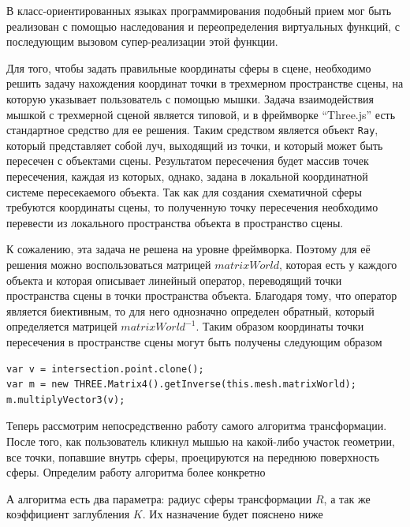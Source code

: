 \documentclass[12pt, a4paper]{article}
\begin{document}
В класс-ориентированных языках программирования подобный прием мог быть
реализован с помощью наследования и переопределения
виртуальных функций, с последующим вызовом супер-реализации этой функции.

Для того, чтобы задать правильные координаты сферы в сцене, необходимо решить
задачу нахождения координат точки в трехмерном пространстве сцены, на которую
указывает пользователь с помощью мышки. Задача взаимодействия
мышкой с трехмерной сценой является типовой, и в фреймворке ``Three.js'' есть
стандартное
средство для ее решения. Таким средством является объект \texttt{Ray}, который
представляет собой луч, выходящий из точки, и который может быть пересечен с
объектами сцены. Результатом пересечения будет массив точек пересечения,
каждая из которых, однако, задана в локальной координатной системе пересекаемого
объекта. Так как для создания схематичной сферы требуются координаты сцены, то
полученную точку пересечения необходимо перевести из локального пространства
объекта в пространство сцены.

К сожалению, эта задача не решена на уровне фреймворка. Поэтому для её решения
можно
воспользоваться матрицей $matrixWorld$, которая
есть у каждого объекта и которая описывает линейный оператор, переводящий точки
пространства сцены в точки пространства объекта. Благодаря тому, что оператор
является биективным, то для него однозначно определен обратный, который
определяется матрицей $matrixWorld^{-1}$. Таким образом
координаты точки пересечения в пространстве сцены могут быть получены следующим
образом

\begin{lstlisting}
var v = intersection.point.clone();
var m = new THREE.Matrix4().getInverse(this.mesh.matrixWorld);
m.multiplyVector3(v);
\end{lstlisting}

Теперь рассмотрим непосредственно работу самого алгоритма трансформации. После
того, как пользователь кликнул мышью на какой-либо участок геометрии, все точки,
попавшие внутрь сферы, проецируются на переднюю поверхность сферы. Определим
работу алгоритма более конкретно

А алгоритма есть два параметра: радиус сферы трансформации $R$, а так же
коэффициент заглубления $K$. Их назначение будет пояснено ниже
\end{document}
